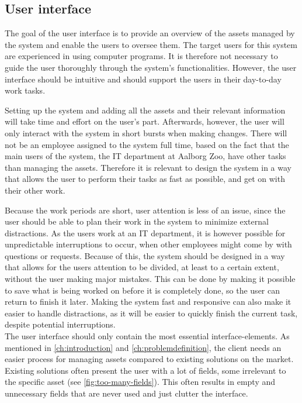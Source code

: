 \subsection{User interface}\label{ssc:UIAnalysis}
The goal of the user interface is to provide an overview of the assets managed by the system and enable the users to oversee them. The target users for this system are experienced in using computer programs. It is therefore not necessary to guide the user thoroughly through the system's functionalities. However, the user interface should be intuitive and should support the users in their day-to-day work tasks.
\par

Setting up the system and adding all the assets and their relevant information will take time and effort on the user's part. Afterwards, however, the user will only interact with the system in short bursts when making changes. There will not be an employee assigned to the system full time, based on the fact that the main users of the system, the IT department at Aalborg Zoo, have other tasks than managing the assets. Therefore it is relevant to design the system in a way that allows the user to perform their tasks as fast as possible, and get on with their other work.
\par
Because the work periods are short, user attention is less of an issue, since the user should be able to plan their work in the system to minimize external distractions. As the users work at an IT department, it is however possible for unpredictable interruptions to occur, when other employees might come by with questions or requests. Because of this, the system should be designed in a way that allows for the users attention to be divided, at least to a certain extent, without the user making major mistakes. This can be done by making it possible to save what is being worked on before it is completely done, so the user can return to finish it later. Making the system fast and responsive can also make it easier to handle distractions, as it will be easier to quickly finish the current task, despite potential interruptions.\\

The user interface should only contain the most essential interface-elements. As mentioned in \autoref{ch:introduction} and \autoref{ch:problemdefinition}, the client needs an easier process for managing assets compared to existing solutions on the market. Existing solutions often present the user with a lot of fields, some irrelevant to the specific asset (see \autoref{fig:too-many-fields}). This often results in empty and unnecessary fields that are never used and just clutter the interface.

